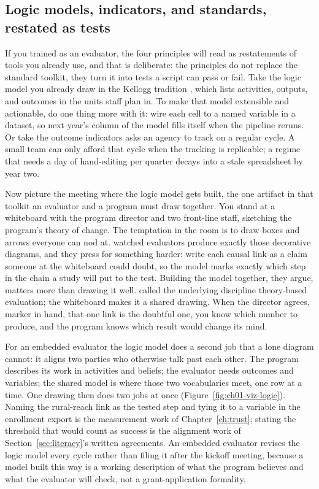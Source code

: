 \documentclass[
    a4paper,
    fontsize=10pt,
    twoside=true,
    numbers=noenddot,
]{kaobook}
\begin{document}
\subsection{Logic models, indicators, and standards, restated as tests}
If you trained as an evaluator, the four principles will read as restatements of tools you already use, and that is deliberate: the principles do not replace the standard toolkit, they turn it into tests a script can pass or fail. Take the logic model you already draw in the Kellogg tradition \parencite{kellogg2004logic}, which lists activities, outputs, and outcomes in the units staff plan in. To make that model extensible and actionable, do one thing more with it: wire each cell to a named variable in a dataset, so next year's column of the model fills itself when the pipeline reruns. Or take the outcome indicators \textcite{hatry2006performance} asks an agency to track on a regular cycle. A small team can only afford that cycle when the tracking is replicable; a regime that needs a day of hand-editing per quarter decays into a stale spreadsheet by year two.

Now picture the meeting where the logic model gets built, the one artifact in that toolkit an evaluator and a program must draw together. You stand at a whiteboard with the program director and two front-line staff, sketching the program's theory of change. The temptation in the room is to draw boxes and arrows everyone can nod at. \textcite{funnell2011purposeful} watched evaluators produce exactly those decorative diagrams, and they press for something harder: write each causal link as a claim someone at the whiteboard could doubt, so the model marks exactly which step in the chain a study will put to the test. Building the model together, they argue, matters more than drawing it well. \textcite{weiss1998evaluation} called the underlying discipline theory-based evaluation; the whiteboard makes it a shared drawing. When the director agrees, marker in hand, that one link is the doubtful one, you know which number to produce, and the program knows which result would change its mind.

For an embedded evaluator the logic model does a second job that a lone diagram cannot: it aligns two parties who otherwise talk past each other. The program describes its work in activities and beliefs; the evaluator needs outcomes and variables; the shared model is where those two vocabularies meet, one row at a time. One drawing then does two jobs at once (Figure~\ref{fig:ch01-viz-logic}). Naming the rural-reach link as the tested step and tying it to a variable in the enrollment export is the measurement work of Chapter~\ref{ch:trust}; stating the threshold that would count as success is the alignment work of Section~\ref{sec:literacy}'s written agreements. An embedded evaluator revises the logic model every cycle rather than filing it after the kickoff meeting, because a model built this way is a working description of what the program believes and what the evaluator will check, not a grant-application formality.
\end{document}
